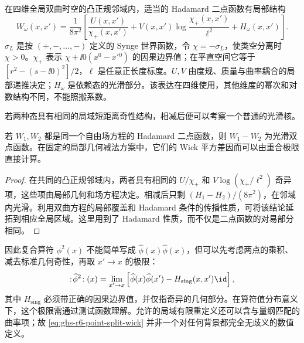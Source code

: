 在四维全局双曲时空的凸正规邻域内，适当的 Hadamard 二点函数有局部结构
\begin{equation}\label{eq:ghs-r6-hadamard-local}
W_\omega(x,x')=\frac{1}{8\pi^2}
\left[\frac{U(x,x')}{\chi_+(x,x')}
+V(x,x')\log\!\frac{\chi_+(x,x')}{\ell^2}
+H_\omega(x,x')\right].
\end{equation}
$\sigma_L$ 是按 $(+,-,\ldots,-)$ 定义的 Synge 世界函数，令 $\chi=-\sigma_L$，使类空分离时 $\chi>0$。$\chi_+$ 表示 $\chi+\ii0(x^0-x\prime{}^0)$ 的因果边界值；在平直空间它等于 $[r^2-(s-\ii0)^2]/2$，$\ell$ 是任意正长度标度。$U,V$ 由度规、质量与曲率耦合的局部递推决定；$H_\omega$ 是依赖态的光滑部分。该表达在四维使用，其他维度的幂次和对数结构不同，不能照搬系数。



若两种态具有相同的局域短距离奇性结构，相减后便可以考察一个普通的光滑核。

\begin{proposition}
若 $W_1,W_2$ 都是同一个自由场方程的 Hadamard 二点函数，则 $W_1-W_2$ 为光滑双点函数。在固定的局部几何减法方案中，它们的 Wick 平方差因而可以由重合极限直接计算。
\end{proposition}

\begin{proof}
在共同的凸正规邻域内，两者具有相同的 $U/\chi_+$ 和 $V\log(\chi_+/\ell^2)$ 奇异项，这些项由局部几何和场方程决定。相减后只剩 $(H_1-H_2)/(8\pi^2)$，在邻域内光滑。利用双曲方程的局部覆盖和 Hadamard 条件的传播性质，可将该结论延拓到相应全局区域。这里用到了 Hadamard 性质，而不仅是二点函数的对易部分相同。
\end{proof}

因此复合算符 $\phi^2(x)$ 不能简单写成 $\widehat\phi(x)\widehat\phi(x)$，但可以先考虑两点的乘积、减去标准几何奇性，再取 $x'\to x$ 的极限：
\begin{equation}\label{eq:ghs-r6-point-split-wick}
:\!\widehat\phi^2\!:(x)
=\lim_{x'\to x}\left[\widehat\phi(x)\widehat\phi(x')-H_{\mathrm{sing}}(x,x')\id\right],
\end{equation}
其中 $H_{\mathrm{sing}}$ 必须带正确的因果边界值，并仅指奇异的几何部分。在算符值分布意义下，这个极限需通过测试函数理解。允许的局域有限重定义还可以含与量纲匹配的曲率项；故 \cref{eq:ghs-r6-point-split-wick} 并非一个对任何背景都完全无歧义的数值定义。


